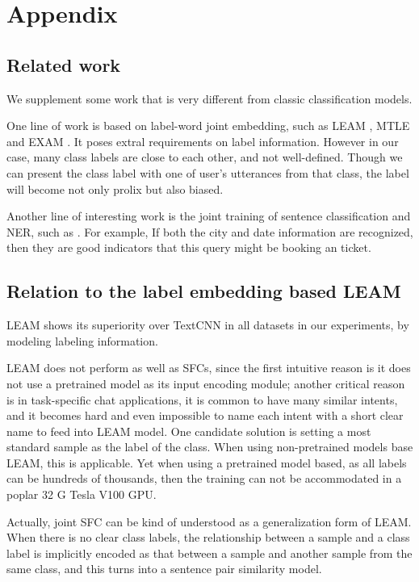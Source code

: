 \newpage

\appendix

\section{Appendix}
\subsection{Related work}
We supplement some work that is very different from classic classification models.

One  line  of  work  is  based  on  label-word  joint  embedding,  such  as LEAM
\cite{wang2018joint}, MTLE \cite{zhang2017multi} and EXAM \cite{du2019explicit}.
It  poses  extral  requirements  on label information. However in our case, many
class  labels  are  close  to  each  other,  and not well-defined. Though we can
present the class label with one of user's utterances from that class, the label
will  become  not  only prolix but also biased.

Another   line   of   interesting   work  is  the  joint  training  of  sentence
classification     and     NER,     such    as    
\cite{kruengkrai2020improving,zhang2020graph,hakkani2016multi,liu2016attention,goo2018slot}.  
For  example,  If  both  the  city and date information are
recognized,  then  they  are good indicators that this query might be booking an
ticket. 

\subsection*{Relation to the label embedding based LEAM}
LEAM shows its superiority over TextCNN in all datasets in our experiments, by modeling labeling information.

LEAM does not perform as well as SFCs, since the first intuitive reason is it does not use a pretrained model as its input encoding module; 
another critical reason is in task-specific chat applications, it is common to have many similar intents, and it becomes hard and even impossible to name each intent with a short clear name to feed into LEAM model.
One candidate solution is setting a most standard sample as the label of the class. 
When using non-pretrained models base LEAM, this is applicable. 
Yet when using a pretrained model based, as all labels can be hundreds of thousands, then the training can not be accommodated in a poplar 32 G Tesla V100 GPU. 

Actually, joint SFC can be kind of understood as a generalization form of LEAM. 
When there is no clear class labels, the relationship between a sample and a class label is implicitly encoded as that between a sample and another sample from the same class, and this turns into a sentence pair similarity model.  


